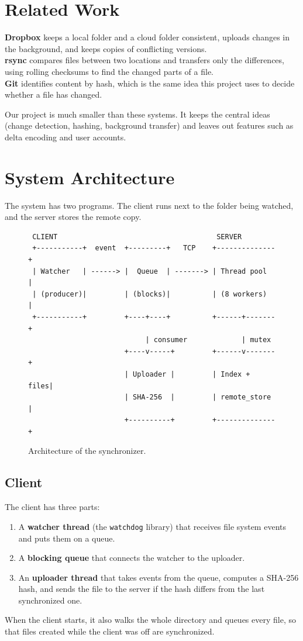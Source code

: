 \documentclass[12pt,a4paper]{article}
\begin{document}
\section{Related Work}
\textbf{Dropbox} keeps a local folder and a cloud folder consistent, uploads changes in the background, and keeps copies of conflicting versions.\\
\textbf{rsync} compares files between two locations and transfers only the differences, using rolling checksums to find the changed parts of a file.\\
\textbf{Git} identifies content by hash, which is the same idea this project uses to decide whether a file has changed.

Our project is much smaller than these systems. It keeps the central ideas (change detection, hashing, background transfer) and leaves out features such as delta encoding and user accounts.

\section{System Architecture}
The system has two programs. The client runs next to the folder being watched, and the server stores the remote copy.

\begin{figure}[h]
\centering
\begin{lstlisting}
 CLIENT                                      SERVER
 +-----------+  event  +---------+   TCP    +--------------+
 | Watcher   | ------> |  Queue  | -------> | Thread pool  |
 | (producer)|         | (blocks)|          | (8 workers)  |
 +-----------+         +----+----+          +------+-------+
                            | consumer             | mutex
                       +----v-----+         +------v-------+
                       | Uploader |         | Index + files|
                       | SHA-256  |         | remote_store |
                       +----------+         +--------------+
\end{lstlisting}
\caption{Architecture of the synchronizer.}
\end{figure}

\subsection{Client}
The client has three parts:
\begin{enumerate}
\item A \textbf{watcher thread} (the \texttt{watchdog} library) that receives file system events and puts them on a queue.
\item A \textbf{blocking queue} that connects the watcher to the uploader.
\item An \textbf{uploader thread} that takes events from the queue, computes a SHA-256 hash, and sends the file to the server if the hash differs from the last synchronized one.
\end{enumerate}
When the client starts, it also walks the whole directory and queues every file, so that files created while the client was off are synchronized.
\end{document}
